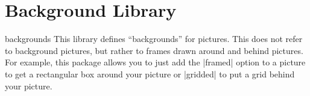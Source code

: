 %
%
%


\section[library-backgrounds]{Background Library}
\label{section-tikz-backgrounds}

\begin{tikzlibrary}{backgrounds}
    This library defines ``backgrounds'' for pictures. This does not refer to
    background pictures, but rather to frames drawn around and behind pictures.
    For example, this package allows you to just add the |framed| option to a
    picture to get a rectangular box around your picture or |gridded| to put a
    grid behind your picture.
\end{tikzlibrary}


